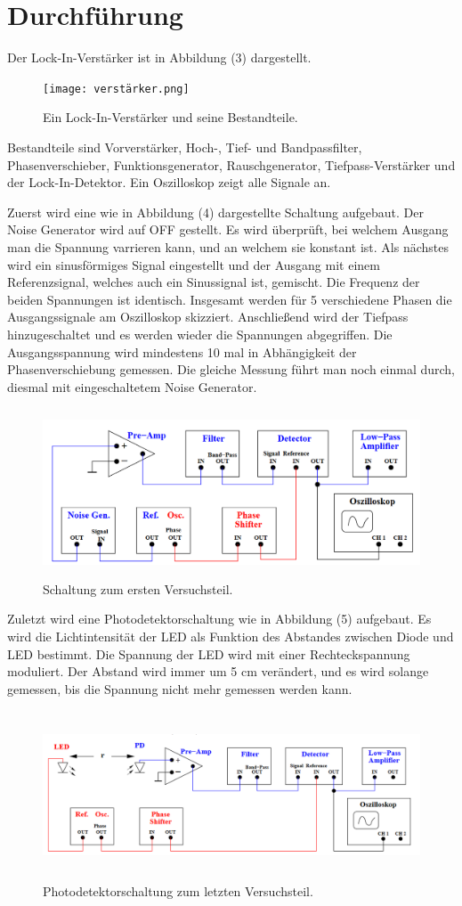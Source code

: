 \section{Durchführung}
\label{sec:Durchführung}

Der Lock-In-Verstärker ist in Abbildung (3) dargestellt.

\begin{figure}[H]
  \centering
  \texttt{[image: verstärker.png]}
  \caption{Ein Lock-In-Verstärker und seine Bestandteile.  \cite[S. 3]{l}}
\end{figure}

\noindent Bestandteile sind Vorverstärker, Hoch-, Tief- und Bandpassfilter, Phasenverschieber, Funktionsgenerator, Rauschgenerator, Tiefpass-Verstärker und der Lock-In-Detektor.
Ein Oszilloskop zeigt alle Signale an. 

\noindent Zuerst wird eine wie in Abbildung (4) dargestellte Schaltung aufgebaut. Der Noise Generator wird auf OFF gestellt.
Es wird überprüft, bei welchem Ausgang man die Spannung varrieren kann, und an welchem sie konstant ist.
Als nächstes wird ein sinusförmiges Signal eingestellt und der Ausgang mit einem Referenzsignal, welches auch ein Sinussignal ist, gemischt.
Die Frequenz der beiden Spannungen ist identisch. Insgesamt werden für 5 verschiedene Phasen die Ausgangssignale am Oszilloskop skizziert.
Anschließend wird der Tiefpass hinzugeschaltet und es werden wieder die Spannungen abgegriffen.
Die Ausgangsspannung wird mindestens 10 mal in Abhängigkeit der Phasenverschiebung gemessen.
Die gleiche Messung führt man noch einmal durch, diesmal mit eingeschaltetem Noise Generator.

\begin{figure}[H]
  \centering
  \includegraphics[height=5cm]{aufbau1.png}
  \caption{Schaltung zum ersten Versuchsteil.  \cite[S. 4]{l}}
\end{figure}

\noindent Zuletzt wird eine Photodetektorschaltung wie in Abbildung (5) aufgebaut. 
Es wird die Lichtintensität der LED als Funktion des Abstandes zwischen Diode und LED bestimmt. 
Die Spannung der LED wird mit einer Rechteckspannung moduliert.
Der Abstand wird immer um 5 cm verändert, und es wird solange gemessen, bis die Spannung nicht mehr gemessen werden kann.

\begin{figure}[H]
  \centering
  \includegraphics[height=5cm]{aufbau2.png}
  \caption{Photodetektorschaltung zum letzten Versuchsteil.  \cite[S. 5]{l}}
\end{figure}
